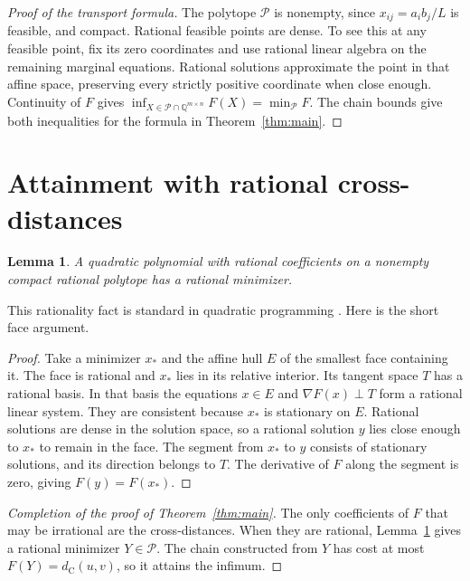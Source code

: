 \documentclass[11pt,a4paper]{amsart}
\newtheorem{lemma}[theorem]{Lemma}
\newcommand{\dc}{d_{\mathrm C}}
\begin{document}
\begin{proof}[Proof of the transport formula]
The polytope \(\mathcal P\) is nonempty, since \(x_{ij}=a_i b_j/L\) is feasible, and compact. Rational feasible points are dense. To see this at any feasible point, fix its zero coordinates and use rational linear algebra on the remaining marginal equations. Rational solutions approximate the point in that affine space, preserving every strictly positive coordinate when close enough. Continuity of \(F\) gives \(\inf_{X\in\mathcal P\cap\mathbb Q^{m\times n}}F(X)=\min_{\mathcal P}F\). The chain bounds give both inequalities for the formula in Theorem~\ref{thm:main}.
\end{proof}

\section{Attainment with rational cross-distances}

\begin{lemma}\label{lem:rational}
A quadratic polynomial with rational coefficients on a nonempty compact rational polytope has a rational minimizer.
\end{lemma}

This rationality fact is standard in quadratic programming \cite{vavasis,delpia}. Here is the short face argument.

\begin{proof}
Take a minimizer \(x_*\) and the affine hull \(E\) of the smallest face containing it. The face is rational and \(x_*\) lies in its relative interior. Its tangent space \(T\) has a rational basis. In that basis the equations \(x\in E\) and \(\nabla F(x)\perp T\) form a rational linear system. They are consistent because \(x_*\) is stationary on \(E\). Rational solutions are dense in the solution space, so a rational solution \(y\) lies close enough to \(x_*\) to remain in the face. The segment from \(x_*\) to \(y\) consists of stationary solutions, and its direction belongs to \(T\). The derivative of \(F\) along the segment is zero, giving \(F(y)=F(x_*)\).
\end{proof}

\begin{proof}[Completion of the proof of Theorem~\ref{thm:main}]
The only coefficients of \(F\) that may be irrational are the cross-distances. When they are rational, Lemma~\ref{lem:rational} gives a rational minimizer \(Y\in\mathcal P\). The chain constructed from \(Y\) has cost at most \(F(Y)=\dc(u,v)\), so it attains the infimum.
\end{proof}
\end{document}

